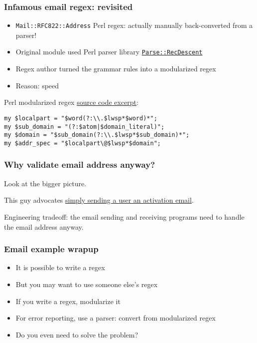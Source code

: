 \begin{frame}[fragile]
  \frametitle{Infamous email regex: revisited}

  \begin{itemize}
    \item \texttt{Mail::RFC822::Address} Perl regex: actually manually back-converted from a parser!
    \item Original module used Perl parser library \href{http://search.cpan.org/~jtbraun/Parse-RecDescent-1.967009/lib/Parse/RecDescent.pm}{\texttt{Parse::RecDescent}}
  \end{itemize}

  \begin{itemize}
    \item Regex author turned the grammar rules into a modularized regex
    \item Reason: speed
  \end{itemize}

  Perl modularized regex \href{http://cpansearch.perl.org/src/PDWARREN/Mail-RFC822-Address-0.3/Address.pm}{source code excerpt}:
  \begin{verbatim}
my $localpart = "$word(?:\\.$lwsp*$word)*";
my $sub_domain = "(?:$atom|$domain_literal)";
my $domain = "$sub_domain(?:\\.$lwsp*$sub_domain)*";
my $addr_spec = "$localpart\@$lwsp*$domain";
  \end{verbatim}
\end{frame}

%

\begin{frame}
  \frametitle{Why validate email address anyway?}

  Look at the bigger picture.

  This guy advocates \href{http://davidcel.is/blog/2012/09/06/stop-validating-email-addresses-with-regex/}{simply sending a user an activation email}.

  Engineering tradeoff: the email sending and receiving programs need to handle the email address anyway.
\end{frame}

\begin{frame}
  \frametitle{Email example wrapup}

  \begin{itemize}
    \item It is possible to write a regex
    \item But you may want to use someone else's regex
    \item If you write a regex, modularize it
    \item For error reporting, use a parser: convert from modularized regex
    \item Do you even need to solve the problem?
  \end{itemize}
\end{frame}

